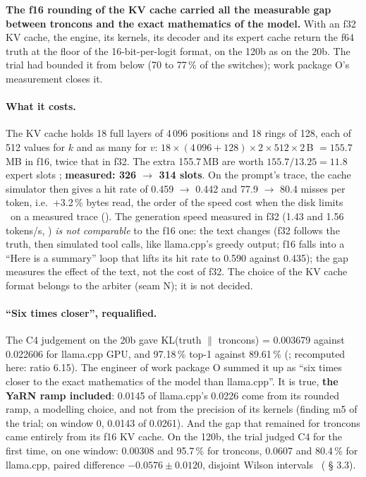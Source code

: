 \begin{enbref}[title={What this establishes}]
\textbf{The f16 rounding of the KV cache carried all the measurable gap between troncons and the exact mathematics of the model.} With an f32 KV cache, the engine, its kernels, its decoder and its expert cache return the f64 truth at the floor of the 16-bit-per-logit format, on the 120b as on the 20b. The trial had bounded it from below (70 to 77\,\% of the switches); work package O's measurement closes it.
\end{enbref}

\paragraph{What it costs.} The KV cache holds 18 full layers of 4\,096 positions and 18 rings of 128, each of 512 values for $k$ and as many for $v$: $18 \times (4\,096 + 128) \times 2 \times 512 \times 2$\,B $= 155.7$\,MB in f16, twice that in f32. The extra 155.7\,MB are worth $155.7/13.25 = 11.8$ expert slots \calc; \textbf{measured: 326 $\to$ 314 slots}. On the prompt's trace, the cache simulator then gives a hit rate of 0.459 $\to$ 0.442 and 77.9 $\to$ 80.4 misses per token, i.e.\ +3.2\,\% bytes read, the order of the speed cost when the disk limits \calc~on a measured trace (). The generation speed measured in f32 (1.43 and 1.56 tokens/s, ) \emph{is not comparable} to the f16 one: the text changes (f32 follows the truth, then simulated tool calls, like llama.cpp's greedy output; f16 falls into a \enquote{Here is a summary} loop that lifts its hit rate to 0.590 against 0.435); the gap measures the effect of the text, not the cost of f32. The choice of the KV cache format belongs to the arbiter (seam N); it is not decided.

\paragraph{\enquote{Six times closer}, requalified.} The C4 judgement on the 20b gave KL(truth $\|$ troncons) = 0.003679 against 0.022606 for llama.cpp GPU, and 97.18\,\% top-1 against 89.61\,\% (; recomputed here: ratio 6.15). The engineer of work package O summed it up as \enquote{six times closer to the exact mathematics of the model than llama.cpp}. It is true, \textbf{the YaRN ramp included}: 0.0145 of llama.cpp's 0.0226 come from its rounded ramp, a modelling choice, and not from the precision of its kernels (finding m5 of the trial; on window 0, 0.0143 of 0.0261). And the gap that remained for troncons came entirely from its f16 KV cache. On the 120b, the trial judged C4 for the first time, on one window: 0.00308 and 95.7\,\% for troncons, 0.0607 and 80.4\,\% for llama.cpp, paired difference $-0.0576 \pm 0.0120$, disjoint Wilson intervals \mes~( § 3.3).

